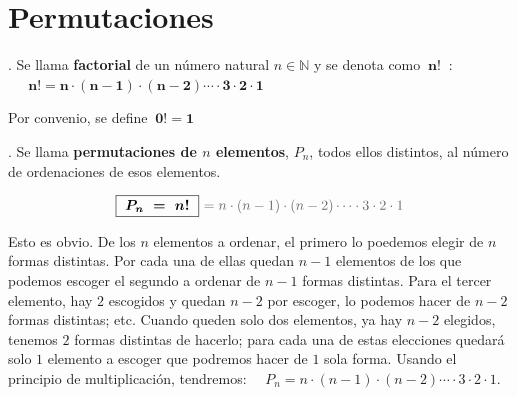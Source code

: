 \section{Permutaciones}

\begin{definition}
	. Se llama \textbf{factorial} de un número natural $n\in \mathbb N$ y se denota como $ \ \boldsymbol{n!} \ $	:
	$ \quad \ \boxed{ \ \boldsymbol{ n!=n \cdot (n-1) \cdot (n-2) \cdots \cdot 3 \cdot 2 \cdot 1 } \ } $
	
	\vspace{2mm} Por convenio, se define $\ \boldsymbol{0!=1}$
\end{definition}

\begin{definition}
	. Se llama \textbf{permutaciones de $n$ elementos}, $P_n$,  todos ellos distintos, al número de ordenaciones de 	esos elementos.
	
	$$ \boxed{\ \boldsymbol{P_n \ = \ n! }  \ } \textcolor{gris}{\ =n \cdot (n-1) \cdot (n-2) \cdots \cdot 3 \cdot 2 \cdot 1 } $$
\end{definition}

\begin{small}
Esto es obvio. De los $n$ elementos a ordenar, el primero lo poedemos elegir de $n$ formas distintas. Por cada una de ellas quedan $n-1$ elementos de los que podemos escoger el segundo a ordenar de $n-1$ formas distintas. Para el tercer elemento, hay $2$ escogidos y quedan $n-2$ por escoger, lo podemos hacer de $n-2$ formas distintas; etc. Cuando queden solo dos elementos, ya hay $n-2$ elegidos, tenemos $2$ formas distintas de hacerlo; para cada una de estas elecciones quedará solo $1$ elemento a escoger que podremos hacer de $1$ sola forma. Usando el principio de multiplicación, tendremos:
$\quad P_n   =n \cdot (n-1) \cdot (n-2) \cdots \cdot 3 \cdot 2 \cdot 1 $. 
\end{small}

